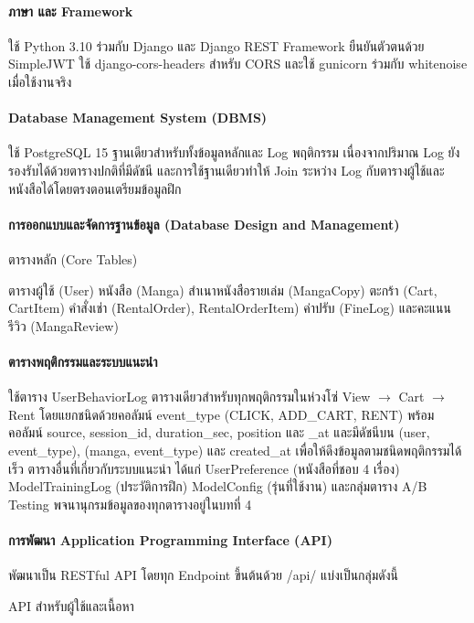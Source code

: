 \paragraph{ภาษา และ Framework}
ใช้ Python 3.10 ร่วมกับ Django และ Django REST Framework ยืนยันตัวตนด้วย SimpleJWT ใช้ django-cors-headers สำหรับ CORS และใช้ gunicorn ร่วมกับ whitenoise เมื่อใช้งานจริง

\paragraph{Database Management System (DBMS)}
ใช้ PostgreSQL 15 ฐานเดียวสำหรับทั้งข้อมูลหลักและ Log พฤติกรรม เนื่องจากปริมาณ Log ยังรองรับได้ด้วยตารางปกติที่มีดัชนี และการใช้ฐานเดียวทำให้ Join ระหว่าง Log กับตารางผู้ใช้และหนังสือได้โดยตรงตอนเตรียมข้อมูลฝึก 

\paragraph{การออกแบบและจัดการฐานข้อมูล (Database Design and Management)}

ตารางหลัก (Core Tables)

ตารางผู้ใช้ (User) หนังสือ (Manga) สำเนาหนังสือรายเล่ม (MangaCopy) ตะกร้า (Cart, CartItem) คำสั่งเช่า (RentalOrder), RentalOrderItem) ค่าปรับ (FineLog) และคะแนนรีวิว (MangaReview)

\paragraph{ตารางพฤติกรรมและระบบแนะนำ}
ใช้ตาราง UserBehaviorLog ตารางเดียวสำหรับทุกพฤติกรรมในห่วงโซ่ View $\rightarrow$ Cart $\rightarrow$ Rent โดยแยกชนิดด้วยคอลัมน์ event\_type (CLICK, ADD\_CART, RENT) พร้อมคอลัมน์ source, session\_id, duration\_sec, position และ \created\_at และมีดัชนีบน (user, event\_type), (manga, event\_type) และ created\_at เพื่อให้ดึงข้อมูลตามชนิดพฤติกรรมได้เร็ว ตารางอื่นที่เกี่ยวกับระบบแนะนำ ได้แก่ UserPreference (หนังสือที่ชอบ 4 เรื่อง) ModelTrainingLog (ประวัติการฝึก) ModelConfig (รุ่นที่ใช้งาน) และกลุ่มตาราง A/B Testing พจนานุกรมข้อมูลของทุกตารางอยู่ในบทที่ 4

\paragraph{การพัฒนา Application Programming Interface (API)}
พัฒนาเป็น RESTful API โดยทุก Endpoint ขึ้นต้นด้วย /api/ แบ่งเป็นกลุ่มดังนี้ 

API สำหรับผู้ใช้และเนื้อหา 

